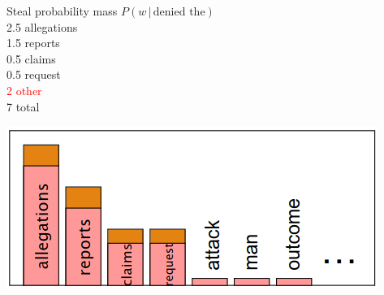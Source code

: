 \documentclass[13.5pt,aspecratio=169]{beamer}
\begin{document}
\begin{frame}
    \begin{minipage}{0.45\textwidth}  %
        \begin{block}{Steal probability mass} %
            \hspace{30pt} $P(w \hspace{2pt} | \hspace{2pt} \text{denied the})$ \\
            \hspace{35pt} 2.5 allegations \\
            \hspace{35pt} 1.5 reports \\
            \hspace{35pt} 0.5 claims \\
            \hspace{35pt} 0.5 request \\
            \hspace{35pt} \textcolor{red}{2 other} \\
            \hspace{35pt} 7 total
        \end{block}
    \end{minipage}\hspace{10pt}
    \begin{minipage}{0.45\textwidth}  %
            \centering
            \includegraphics[scale=0.5]{steal_probability_mass.png}
    \end{minipage}
	

\end{frame}


\end{document}
